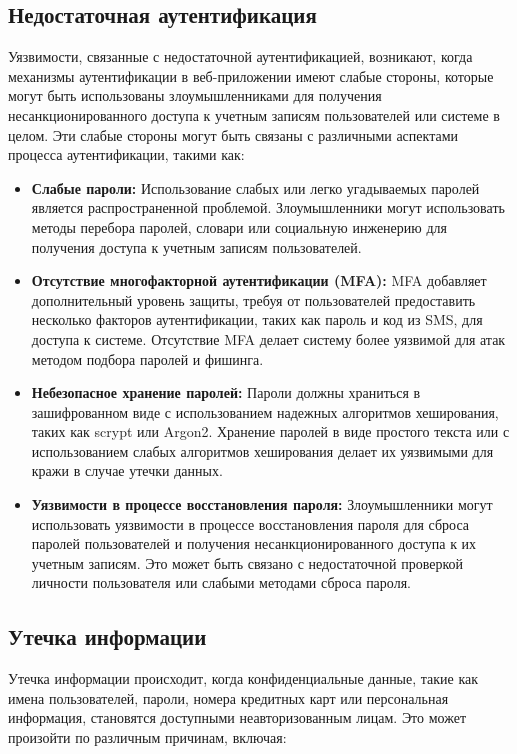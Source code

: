 \documentclass[a4paper,12pt]{diplom}
\begin{document}
	 \subsection{Недостаточная аутентификация}
	 
	 Уязвимости, связанные с недостаточной аутентификацией, возникают, когда механизмы аутентификации в веб-приложении имеют слабые стороны, которые могут быть использованы злоумышленниками для получения несанкционированного доступа к учетным записям пользователей или системе в целом. Эти слабые стороны могут быть связаны с различными аспектами процесса аутентификации, такими как:
	 
	 \begin{itemize}
	 	\item \textbf{Слабые пароли:} Использование слабых или легко угадываемых паролей является распространенной проблемой. Злоумышленники могут использовать методы перебора паролей, словари или социальную инженерию для получения доступа к учетным записям пользователей.
	 	\item \textbf{Отсутствие многофакторной аутентификации (MFA):} MFA добавляет дополнительный уровень защиты, требуя от пользователей предоставить несколько факторов аутентификации, таких как пароль и код из SMS, для доступа к системе. Отсутствие MFA делает систему более уязвимой для атак методом подбора паролей и фишинга.
	 	\item \textbf{Небезопасное хранение паролей:}  Пароли должны храниться в зашифрованном виде с использованием надежных алгоритмов хеширования, таких как scrypt или Argon2. Хранение паролей в виде простого текста или с использованием слабых алгоритмов хеширования делает их уязвимыми для кражи в случае утечки данных.
	 	\item \textbf{Уязвимости в процессе восстановления пароля:}  Злоумышленники могут использовать уязвимости в процессе восстановления пароля для сброса паролей пользователей и получения несанкционированного доступа к их учетным записям. Это может быть связано с недостаточной проверкой личности пользователя или слабыми методами сброса пароля.
	 \end{itemize}
	 
	 \subsection{Утечка информации}
	 
	 Утечка информации происходит, когда конфиденциальные данные, такие как имена пользователей, пароли, номера кредитных карт или персональная информация, становятся доступными неавторизованным лицам. Это может произойти по различным причинам, включая:
	 
\end{document}
